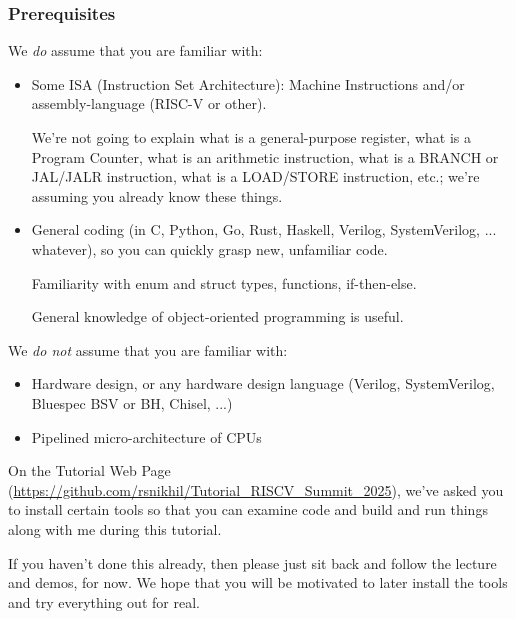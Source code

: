 \begin{frame}[fragile]

\frametitle{Prerequisites}

\begin{center}\scriptsize
 \begin{minipage}{0.9\textwidth}
  We \emph{do} assume that you are familiar with:
  \begin{itemize}

   \item Some ISA (Instruction Set Architecture): Machine Instructions
     and/or assembly-language (RISC-V or other).

     \vspace*{1ex}

     We're not going to explain what is a general-purpose register,
     what is a Program Counter, what is an arithmetic instruction,
     what is a BRANCH or JAL/JALR instruction, what is a LOAD/STORE
     instruction, etc.; we're assuming you already know these things.

   \vspace*{1ex}

   \item General coding (in C, Python, Go, Rust, Haskell, Verilog,
     SystemVerilog, ... whatever), so you can quickly grasp new,
     unfamiliar code.

     Familiarity with enum and struct types, functions, if-then-else.

     General knowledge of object-oriented programming is useful.
  \end{itemize}

  \vspace*{5ex}

  We \emph{do not} assume that you are familiar with:
  \begin{itemize}

   \item Hardware design, or any hardware design language (Verilog,
     SystemVerilog, Bluespec BSV or BH, Chisel, ...)

   \item Pipelined micro-architecture of CPUs

  \end{itemize}

  \vspace*{5ex}

  On the Tutorial Web Page
    (\url{https://github.com/rsnikhil/Tutorial_RISCV_Summit_2025}),
    we've asked you to install certain tools so that you can examine
    code and build and run things along with me during this tutorial.

  \vspace*{2ex}

  If you haven't done this already, then please just sit back and
  follow the lecture and demos, for now.  We hope that you will be
  motivated to later install the tools and try everything out for
  real.

 \end{minipage}
\end{center}

\end{frame}



